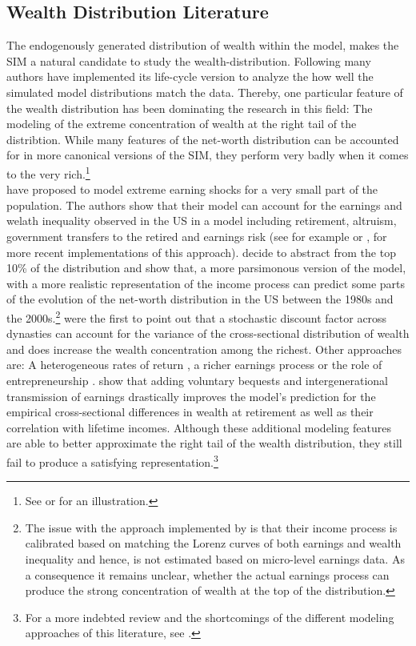 \documentclass[a4paper,12pt,legno]{article}
\begin{document}
\subsection{Wealth Distribution Literature}
The endogenously generated distribution of wealth within the model, makes the SIM a natural candidate to study the wealth-distribution.
Following \cite{huggett1996wealth} many authors have implemented its life-cycle version to analyze the how well the simulated model distributions match the data. Thereby, one particular feature of the wealth distribution has been dominating the research in this field: The modeling of the extreme concentration of wealth at the right tail of the distribtion. While many features of the net-worth distribution can be accounted for in more canonical versions of the SIM, they perform very badly when it comes to the very rich.\footnote{See \cite{huggett1996wealth} or \cite{quadrini1997understanding} for an illustration.} \\
\cite{castaneda2003} have proposed to model extreme earning shocks for a very small part of the population. The authors show that their model can account for the earnings and welath inequality observed in the US in a model including retirement, altruism, government transfers to the retired and earnings risk (see for example \citep{diaz2010} or \citep{kaymak2016evolution}, for more recent implementations of this approach).  \cite{hintermaier2011} decide to abstract from the top 10\% of the distribution and show that, a more parsimonous version of the model, with a more realistic representation of the income process can predict some parts of the evolution of the net-worth distribution in the US between the 1980s and the 2000s.\footnote{The issue with the approach implemented by \cite{castaneda2003} is that their income process is calibrated based on matching the Lorenz curves of both earnings and wealth inequality and hence, is not estimated based on micro-level earnings data. As a consequence it remains unclear, whether the actual earnings process can produce the strong concentration of wealth at the top of the distribution.} \cite{krusell1998} were the first to point out that a stochastic discount factor across dynasties can account for the variance of the cross-sectional distribution of wealth and does increase the wealth concentration among the richest. Other approaches are: A heterogeneous rates of return \cite{benhabib2011distribution}, a richer earnings process \citep{denardi2016}  or the role of entrepreneurship \citep{cagetti2009}. \cite{denardi2014} show that adding voluntary bequests and intergenerational transmission of earnings drastically improves the model's prediction for the empirical cross-sectional differences in wealth at retirement as well as their correlation with lifetime incomes.  Although these additional modeling features are able to better approximate the right tail of the wealth distribution, they still fail to produce a satisfying representation.\footnote{For a more indebted review and the shortcomings of the different modeling approaches of this literature, see \citep{denardi2017}.}  \\
\end{document}
